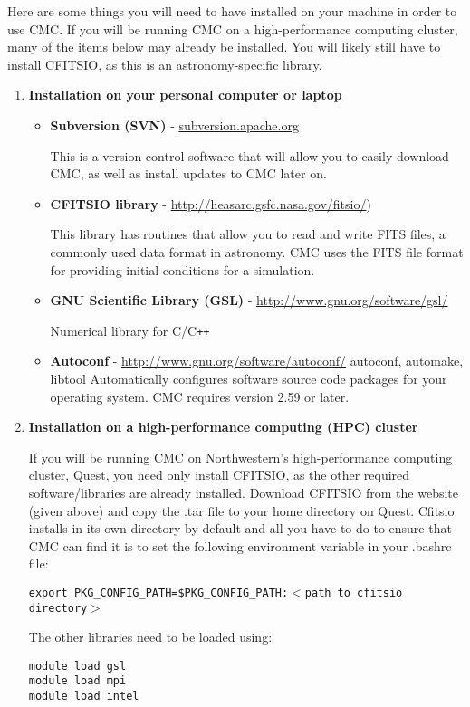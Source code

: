\documentclass[11pt]{article}
\begin{document}
Here are some things you will need to have installed on your machine in order to use CMC. If you will be running CMC on a high-performance computing cluster, many of the items below may already be installed. You will likely still have to install CFITSIO, as this is an astronomy-specific library.
\begin{enumerate} 

\item \textbf{Installation on your personal computer or laptop}

\begin{itemize}

\item \textbf{Subversion (SVN)} - \url{subversion.apache.org}

This is a version-control software that will allow you to easily download CMC, as well as install updates to CMC later on.

\item \textbf{CFITSIO library} - \url{http://heasarc.gsfc.nasa.gov/fitsio/})

This library has routines that allow you to read and write  FITS files, a commonly used data format in astronomy. CMC uses the FITS file format for providing initial conditions for a simulation.

\item \textbf{GNU Scientific Library (GSL)} - \url{http://www.gnu.org/software/gsl/}


Numerical library for C/C\verb!++! 
\item \textbf{Autoconf} - \url{http://www.gnu.org/software/autoconf/}
autoconf, automake, libtool
Automatically configures software source code packages for your operating system. CMC requires version 2.59 or later. 

\end{itemize}

\item \textbf{Installation on a high-performance computing (HPC) cluster}

If you will be running CMC on Northwestern's high-performance computing cluster, Quest, you need only install CFITSIO, as the other required software/libraries are already installed. Download CFITSIO from the website (given above) and copy the .tar file to your home directory on Quest. Cfitsio installs in its own directory by default and all you have to do to ensure that CMC can find it is to set the following environment variable in your .bashrc file:

{\addtolength{\leftskip}{10mm} 
\texttt {export PKG\_CONFIG\_PATH=\$PKG\_CONFIG\_PATH:$<$path to cfitsio directory$>$}

}

The other libraries need to be loaded using:

{\addtolength{\leftskip}{10mm} 
\texttt{module load gsl}\\
\texttt{module load mpi}\\
\texttt{module load intel}

}

\end{enumerate}
\end{document}
